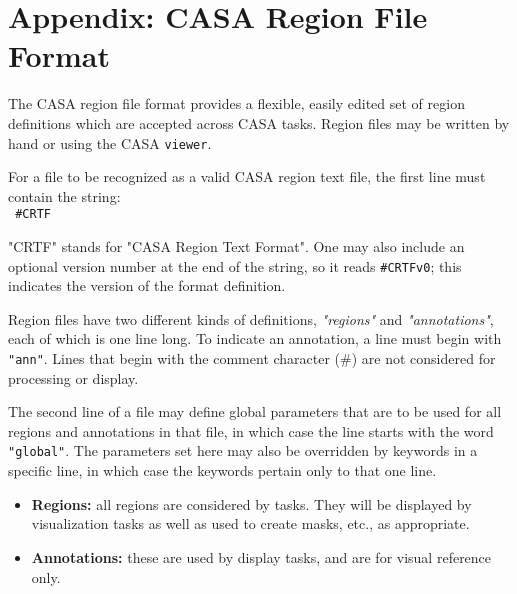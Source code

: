 

\chapter[Appendix: CASA Region File Format]
         {Appendix: CASA Region File Format}
\label{chapter:regionformat}


The CASA region file format provides a flexible, easily edited set of
region definitions which are accepted across CASA tasks.  Region files
may be written by hand or using the CASA {\tt viewer}.

For a file to be recognized as a valid CASA region text file, the
first line must contain the string:\\

{\tt 
\#CRTF
}


"CRTF" stands for "CASA Region Text Format".  One may also include an
optional version number at the end of the string, so it reads
{\tt \#CRTFv0}; this indicates the version of the format
definition.

Region files have two different kinds of definitions, {\it "regions"} and
{\it "annotations"}, each of which is one line long. To indicate an
annotation, a line must begin with {\tt "ann"}.  Lines that begin with the
comment character (\#) are not considered for processing or display.

The second line of a file may define global parameters that are to be
used for all regions and annotations in that file, in which case the
line starts with the word {\tt "global"}.  The parameters set here may
also be overridden by keywords in a specific line, in which case the
keywords pertain only to that one line.

\begin{itemize}

\item {\bf Regions:} all regions are considered by tasks.  They will
  be displayed by visualization tasks as well as used to create masks,
  etc., as appropriate.

\item {\bf Annotations:} these are used by display tasks, and are for
  visual reference only.

\end{itemize}

